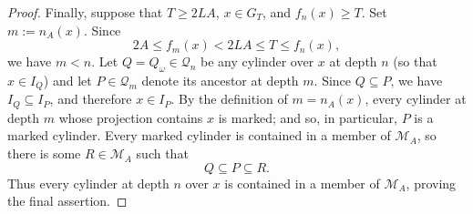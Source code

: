 \documentclass[10pt,a4paper]{amsart}
\begin{document}
\begin{proof}
Finally, suppose that $T\geq 2LA$, $x\in G_T$, and
$f_n(x)\geq T$.  Set $m:=n_A(x)$.  Since
$$
2A\leq f_m(x)<2LA\leq T\leq f_n(x),
$$
we have $m<n$.  Let $Q=Q_\omega\in\mathscr Q_n$ be any
cylinder over $x$ at depth $n$ (so that $x\in I_Q$) and let
$
P \in \mathscr Q_m
$
denote its ancestor at depth $m$.  Since $Q\subseteq P$, we have
$I_Q\subseteq I_P$, and therefore $x\in I_P$.  By the definition
of $m=n_A(x)$, every cylinder at depth $m$ whose projection contains
$x$ is marked; and so, in particular, $P$ is a marked cylinder.  Every marked cylinder is contained in a member of $\mathscr M_A$, so there is
some $R\in\mathscr M_A$ such that
\[
Q\subseteq P\subseteq R.
\]
Thus every cylinder at depth $n$ over $x$ is contained in a member of
$\mathscr M_A$, proving the final assertion.
\end{proof}
\end{document}
